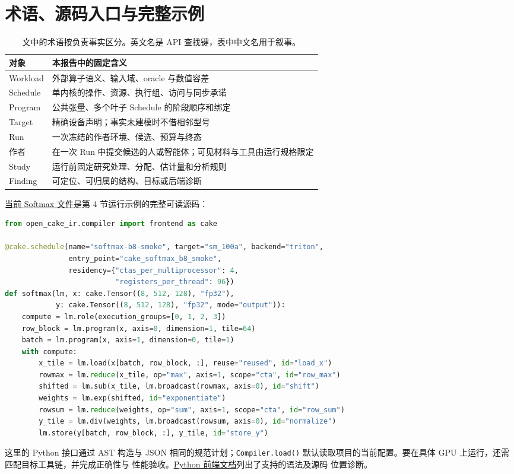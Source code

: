 \documentclass[UTF8,11pt,a4paper,fontset=none]{ctexart}
\newcommand{\code}[1]{\texttt{#1}}
\newcommand{\repo}[2]{\href{https://github.com/qhy991/open-cake-ir/blob/677eb444fec593294c470dcc5793262ae769fce2/#1}{#2}}
\begin{document}
\clearpage
\appendix
\section{术语、源码入口与完整示例}

\begin{table}[htbp]
\centering\small
\caption{文中的术语按负责事实区分。英文名是 API 查找键，表中中文名用于叙事。}
\begin{tabularx}{\textwidth}{@{}p{31mm}Y@{}}
\toprule
{}对象 & 本报告中的固定含义 \\
\midrule
Workload & 外部算子语义、输入域、oracle 与数值容差 \\
Schedule & 单内核的操作、资源、执行组、访问与同步承诺 \\
Program & 公共张量、多个叶子 Schedule 的阶段顺序和绑定 \\
Target & 精确设备声明；事实未建模时不借相邻型号 \\
Run & 一次冻结的作者环境、候选、预算与终态 \\
作者 & 在一次 Run 中提交候选的人或智能体；可见材料与工具由运行规格限定 \\
Study & 运行前固定研究处理、分配、估计量和分析规则 \\
Finding & 可定位、可归属的结构、目标或后端诊断 \\
\bottomrule
\end{tabularx}
\end{table}

\repo{examples/python/softmax.py}{当前 Softmax 文件}是第 4 节运行示例的完整可读源码：
\begin{lstlisting}[style=reportcode,language=Python]
from open_cake_ir.compiler import frontend as cake

@cake.schedule(name="softmax-b8-smoke", target="sm_100a", backend="triton",
               entry_point="cake_softmax_b8_smoke",
               residency={"ctas_per_multiprocessor": 4,
                          "registers_per_thread": 96})
def softmax(lm, x: cake.Tensor((8, 512, 128), "fp32"),
            y: cake.Tensor((8, 512, 128), "fp32", mode="output")):
    compute = lm.role(execution_groups=[0, 1, 2, 3])
    row_block = lm.program(x, axis=0, dimension=1, tile=64)
    batch = lm.program(x, axis=1, dimension=0, tile=1)
    with compute:
        x_tile = lm.load(x[batch, row_block, :], reuse="reused", id="load_x")
        rowmax = lm.reduce(x_tile, op="max", axis=1, scope="cta", id="row_max")
        shifted = lm.sub(x_tile, lm.broadcast(rowmax, axis=0), id="shift")
        weights = lm.exp(shifted, id="exponentiate")
        rowsum = lm.reduce(weights, op="sum", axis=1, scope="cta", id="row_sum")
        y_tile = lm.div(weights, lm.broadcast(rowsum, axis=0), id="normalize")
        lm.store(y[batch, row_block, :], y_tile, id="store_y")
\end{lstlisting}
这里的 Python 接口通过 AST 构造与 JSON 相同的规范计划；\code{Compiler.load()}
默认读取项目的当前配置。要在具体 GPU 上运行，还需匹配目标工具链，并完成正确性与
性能验收。\repo{docs/PYTHON_FRONTEND.md}{Python 前端文档}列出了支持的语法及源码
位置诊断。
\end{document}
